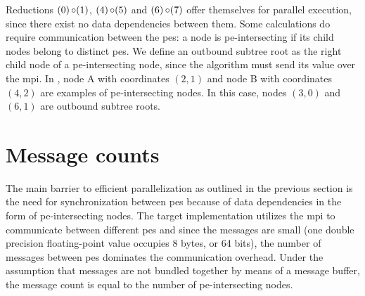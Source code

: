 Reductions $(0) \operatorname{\circ} (1)$, $(4) \operatorname{\circ} (5)$ and $(6) \operatorname{\circ} (7)$ offer themselves for parallel execution, since there exist no data dependencies between them.
Some calculations do require communication between the \glspl{pe}:
a node is \gls{pe}-intersecting if its child nodes belong to distinct \glspl{pe}.
We define an outbound subtree root as the right child node of a \gls{pe}-intersecting node, since the algorithm must send its value over the \gls{mpi}.
In , node A with coordinates $(2,1)$ and node B with coordinates $(4,2)$ are examples of \gls{pe}-intersecting nodes.
In this case, nodes $(3,0)$ and $(6,1)$ are outbound subtree roots.

\section{Message counts}
\label{sec:MessageCounts}
The main barrier to efficient parallelization as outlined in the previous section is the need for synchronization between \glspl{pe} because of data dependencies in the form of \gls{pe}-intersecting nodes.
The target implementation utilizes the \gls{mpi} to communicate between different \glspl{pe} and since the messages are small (one double precision floating-point value occupies 8 bytes, or 64 bits), the number of messages between \glspl{pe} dominates the communication overhead.
Under the assumption that messages are not bundled together by means of a message buffer, the message count is equal to the number of \gls{pe}-intersecting nodes.

